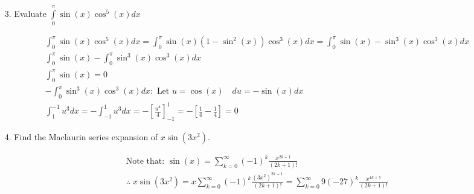 \begin{itemize}
        \item [3.] Evaluate $\int\limits_{0}^{\pi}\sin(x)\cos^{5}(x)dx$
        \\
        \begin{mdframed}
            \begin{equation*}
                \begin{gathered}
                    \int_{0}^{\pi}\sin(x)\cos^{5}(x)dx = 
                    \int_{0}^{\pi}\sin(x)(1-\sin^{2}(x))\cos^{3}(x)dx =
                    \int_{0}^{\pi}\sin(x)-\sin^{3}(x)\cos^{3}(x)dx                  \\
                    \int_{0}^{\pi}\sin(x)-\int_{0}^{\pi}\sin^{3}(x)\cos^{3}(x)dx    \\
                    \int_{0}^{\pi}\sin(x) = 0                                       \\
                    -\int_{0}^{\pi}\sin^{3}(x)\cos^{3}(x)dx: 
                    \text{ Let } u = \cos(x) \quad du = -\sin(x)dx                  \\
                    \int_{1}^{-1}u^{3}dx = -\int_{-1}^{1}u^{3}dx = 
                    -\left[\frac{u^{4}}{4}\right]_{-1}^{1} =
                    -\left[\frac{1}{4}-\frac{1}{4}\right] = \boxed{0}
                \end{gathered}
            \end{equation*}
        \end{mdframed}

        \item [4.] Find the Maclaurin series expansion of $x\sin(3x^{2})$.
        \\
        \begin{mdframed}
            \begin{equation*}
                \begin{gathered}
                    \text{Note that: } \sin(x) = 
                    \sum_{k=0}^{\infty} (-1)^{k}\frac{x^{2k+1}}{(2k+1)!}   \\
                    \therefore \; x\sin(3x^{2}) = 
                    x\sum_{k=0}^{\infty} (-1)^{k}\frac{(3x^{2})^{2k+1}}{(2k+1)!} =
                    \boxed{\sum_{k=0}^{\infty} 9(-27)^{k}\frac{x^{4k+5}}{(2k+1)!}}
                \end{gathered}
            \end{equation*}
        \end{mdframed}

        \pagebreak


\end{itemize}
